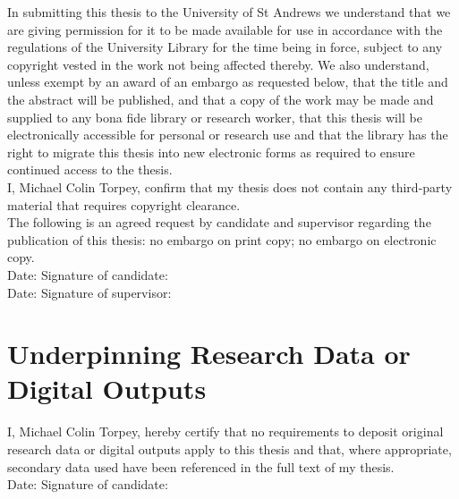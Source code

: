 \noindent
In submitting this thesis to the University of St Andrews we understand that we
are giving permission for it to be made available for use in accordance with the
regulations of the University Library for the time being in force, subject to
any copyright vested in the work not being affected thereby. We also understand,
unless exempt by an award of an embargo as requested below, that the title and
the abstract will be published, and that a copy of the work may be made and
supplied to any bona fide library or research worker, that this thesis will be
electronically accessible for personal or research use and that the library has
the right to migrate this thesis into new electronic forms as required to ensure
continued access to the thesis.
\\

\noindent
I, Michael Colin Torpey, confirm that my thesis does not contain any third-party
material that requires copyright clearance.
\\

\noindent
The following is an agreed request by candidate and supervisor regarding the
publication of this thesis: no embargo on print copy; no embargo on electronic
copy.
\\

\vspace{1.0em}
\noindent
Date:\makebox[7em]{\dotfill}
Signature of candidate:\dotfill
\\

\vspace{1.0em}
\noindent
Date:\makebox[7em]{\dotfill}
Signature of supervisor:\dotfill
\\

\vspace{-1.3em}
\section*{Underpinning Research Data or Digital Outputs}


I, Michael Colin Torpey, hereby certify that no requirements to deposit original
research data or digital outputs apply to this thesis and that, where
appropriate, secondary data used have been referenced in the full text of my
thesis.
\\

\vspace{1.0em}
\noindent
Date:\makebox[7em]{\dotfill}
Signature of candidate:\dotfill
\\

\restoregeometry
